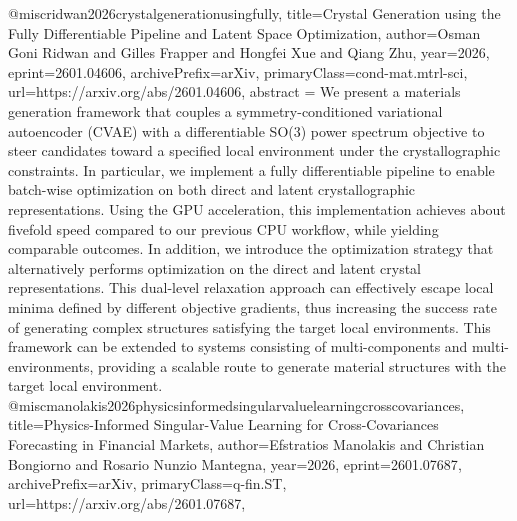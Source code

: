 {}@misc{ridwan2026crystalgenerationusingfully,
      title={Crystal Generation using the Fully Differentiable Pipeline and Latent Space Optimization}, 
      author={Osman Goni Ridwan and Gilles Frapper and Hongfei Xue and Qiang Zhu},
      year={2026},
      eprint={2601.04606},
      archivePrefix={arXiv},
      primaryClass={cond-mat.mtrl-sci},
      url={https://arxiv.org/abs/2601.04606},
      abstract = {We present a materials generation framework that couples a symmetry-conditioned variational autoencoder (CVAE) with a differentiable SO(3) power spectrum objective to steer candidates toward a specified local environment under the crystallographic constraints. In particular, we implement a fully differentiable pipeline to enable batch-wise optimization on both direct and latent crystallographic representations. Using the GPU acceleration, this implementation achieves about fivefold speed compared to our previous CPU workflow, while yielding comparable outcomes. In addition, we introduce the optimization strategy that alternatively performs optimization on the direct and latent crystal representations. This dual-level relaxation approach can effectively escape local minima defined by different objective gradients, thus increasing the success rate of generating complex structures satisfying the target local environments. This framework can be extended to systems consisting of multi-components and multi-environments, providing a scalable route to generate material structures with the target local environment.}
}@misc{manolakis2026physicsinformedsingularvaluelearningcrosscovariances,
      title={Physics-Informed Singular-Value Learning for Cross-Covariances Forecasting in Financial Markets}, 
      author={Efstratios Manolakis and Christian Bongiorno and Rosario Nunzio Mantegna},
      year={2026},
      eprint={2601.07687},
      archivePrefix={arXiv},
      primaryClass={q-fin.ST},
      url={https://arxiv.org/abs/2601.07687},
}
